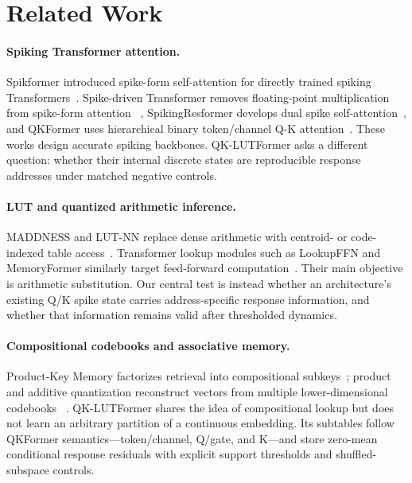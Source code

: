 \section{Related Work}
\label{sec:related}

\paragraph{Spiking Transformer attention.}
Spikformer introduced spike-form self-attention for directly trained spiking
Transformers~\cite{zhou2023spikformer}. Spike-driven Transformer removes
floating-point multiplication from spike-form attention
~\cite{yao2023spikedriven}, SpikingResformer develops dual spike
self-attention~\cite{shi2024spikingresformer}, and QKFormer uses hierarchical
binary token/channel Q-K attention~\cite{zhou2024qkformer}. These works design
accurate spiking backbones. QK-LUTFormer asks a different question: whether
their internal discrete states are reproducible response addresses under
matched negative controls.

\paragraph{LUT and quantized arithmetic inference.}
MADDNESS and LUT-NN replace dense arithmetic with centroid- or
code-indexed table access~\cite{blalock2021maddness,tang2023lutnn}.
Transformer lookup modules such as LookupFFN and MemoryFormer similarly target
feed-forward computation~\cite{zeng2023lookupffn,wang2024memoryformer}. Their
main objective is arithmetic substitution. Our central test is instead whether
an architecture's existing Q/K spike state carries address-specific response
information, and whether that information remains valid after thresholded
dynamics.

\paragraph{Compositional codebooks and associative memory.}
Product-Key Memory factorizes retrieval into compositional
subkeys~\cite{lample2019large}; product and additive quantization reconstruct
vectors from multiple lower-dimensional codebooks
~\cite{jegou2011product,babenko2014additive}. QK-LUTFormer shares the idea of
compositional lookup but does not learn an arbitrary partition of a continuous
embedding. Its subtables follow QKFormer semantics---token/channel, Q/gate,
and K---and store zero-mean conditional response residuals with explicit
support thresholds and shuffled-subspace controls.

